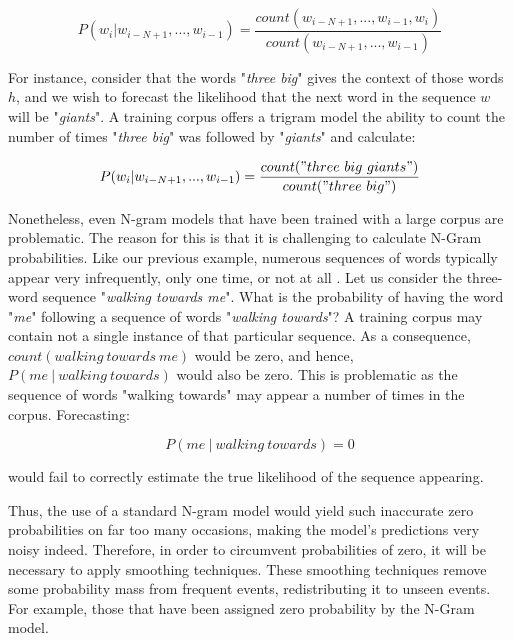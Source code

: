 \begin{equation}
P(w_i|w_{i-N+1},...,w_{i-1}) = \frac{count(w_{i-N+1},...,w_{i-1}, w_i)}{count(w_{i-N+1},...,w_{i-1})}
\end{equation}

For instance, consider that the words "\emph{three big}" gives the context of those words $h$, and we wish to forecast the likelihood that the next word in the sequence $w$ will be "\emph{giants}". A training corpus offers a trigram model the ability to count the number of times "\emph{three big}" was followed by "\emph{giants}" and calculate:

\begin{equation}
P(w_i|w_{i-N+1},...,w_{i-1}) = \frac{count("three\ big\ giants")}{count("three\ big")}
\end{equation}

Nonetheless, even N-gram models that have been trained with a large corpus are problematic. The reason for this is that it is challenging to calculate N-Gram probabilities. Like our previous example, numerous sequences of words typically appear very infrequently, only one time, or not at all \parencite{goodman2001bit,mikolov2012statistical,rosenfeld2000two}. Let us consider the three-word sequence "\emph{walking towards me}". What is the probability of having the word "\emph{me}" following a sequence of words "\emph{walking towards}"? A training corpus may contain not a single instance of that particular sequence. As a consequence, $count(walking\ towards\ me)$ would be zero, and hence, $P(me\ |\ walking\ towards)$ would also be zero. This is problematic as the sequence of words "walking towards" may appear a number of times in the corpus. Forecasting:

\begin{equation}
P(me\ |\ walking\ towards) = 0
\end{equation}

would fail to correctly estimate the true likelihood of the sequence appearing.

Thus, the use of a standard N-gram model would yield such inaccurate zero probabilities on far too many occasions, making the model's predictions very noisy indeed. Therefore, in order to circumvent probabilities of zero, it will be necessary to apply smoothing techniques. These smoothing techniques remove some probability mass from frequent events, redistributing it to unseen events. For example, those that have been assigned zero probability by the N-Gram model. \parencite{goodman2001bit,jurafsky2014speech,mikolov2012statistical}

